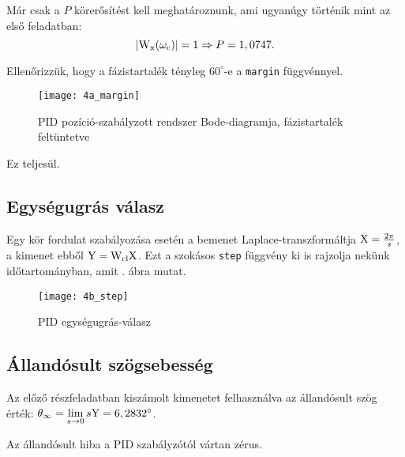 Már csak a $P$ körerősítést kell meghatároznunk, ami ugyanúgy történik mint az első feladatban:
\begin{equation}
	\left\lvert \mathrm{W}_\text{x}(\omega_\text{c}) \right\rvert = 1 \Rightarrow P = 1,0747.
\end{equation}

Ellenőrizzük, hogy a fázistartalék tényleg $60^\circ$-e a \verb|margin| függvénnyel.
\begin{figure}[H]
	\centering
	\texttt{[image: 4a\_margin]}
	\caption{PID pozíció-szabályzott rendszer Bode-diagramja, fázistartalék feltüntetve}
	\label{fig:4a_margin}
\end{figure}

Ez teljesül.


\subsection{Egységugrás válasz}

Egy kör fordulat szabályozása esetén a bemenet Laplace-transzformáltja $\mathrm{X}=\frac{2\pi}{s}$,
a kimenet ebből $\mathrm{Y} = \mathrm{W}_\text{cl}\mathrm{X}$. Ezt a szokásos \verb|step| függvény
ki is rajzolja nekünk időtartományban, amit . ábra mutat.

\begin{figure}[H]
	\centering
	\texttt{[image: 4b\_step]}
	\caption{PID egységugrás-válasz}
	\label{fig:4b_step}
\end{figure}


\subsection{Állandósult szögsebesség}

Az előző részfeladatban kiszámolt kimenetet felhasználva az állandósult szög érték:
$\theta_\infty = \lim\limits_{s\rightarrow 0}s\mathrm{Y} = 6,2832^\circ$.

Az állandósult hiba a PID szabályzótól vártan zérus.

